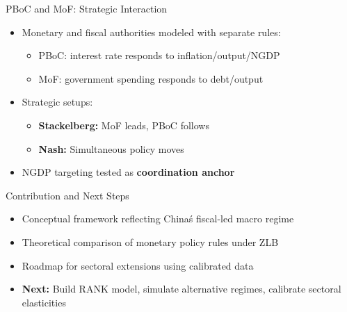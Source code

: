\documentclass{beamer}
\begin{document}
\begin{frame}{PBoC and MoF: Strategic Interaction}
  \begin{itemize}
    \item Monetary and fiscal authorities modeled with separate rules:
    \begin{itemize}
      \item PBoC: interest rate responds to inflation/output/NGDP
      \item MoF: government spending responds to debt/output
    \end{itemize}
    \item Strategic setups:
    \begin{itemize}
      \item \textbf{Stackelberg:} MoF leads, PBoC follows
      \item \textbf{Nash:} Simultaneous policy moves
    \end{itemize}
    \item NGDP targeting tested as \textbf{coordination anchor}
  \end{itemize}
\end{frame}

\begin{frame}{Contribution and Next Steps}
  \begin{itemize}
    \item Conceptual framework reflecting China\'s fiscal-led macro regime
    \item Theoretical comparison of monetary policy rules under ZLB
    \item Roadmap for sectoral extensions using calibrated data
    \item \textbf{Next:} Build RANK model, simulate alternative regimes, calibrate sectoral elasticities
  \end{itemize}
\end{frame}
\end{document}
